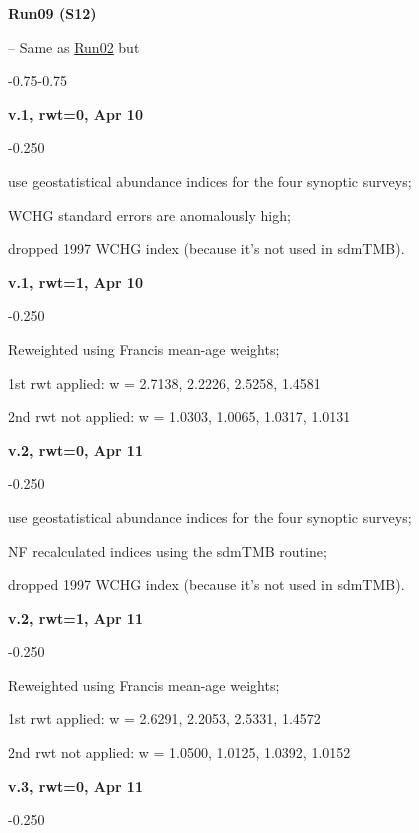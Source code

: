\hypertarget{R09}{\textbf{Run09 (S12)}} -- Same as \hyperlink{R02}{Run02} but
\begin{itemize_csas}{-0.75}{-0.75}
	\item \textbf{v.1, rwt=0, Apr 10}
	\begin{itemize_csas}{-0.25}{0}
		\item use geostatistical abundance indices for the four synoptic surveys;
		\item WCHG standard errors are anomalously high;
		\item dropped 1997 WCHG index (because it's not used in sdmTMB).
	\end{itemize_csas}
	\item \textbf{v.1, rwt=1, Apr 10}
	\begin{itemize_csas}{-0.25}{0}
		\item Reweighted using Francis mean-age weights;
		\item 1st rwt applied: w = 2.7138, 2.2226, 2.5258, 1.4581
		\item 2nd rwt not applied: w = 1.0303, 1.0065, 1.0317, 1.0131
	\end{itemize_csas}
	\item \textbf{v.2, rwt=0, Apr 11}
	\begin{itemize_csas}{-0.25}{0}
		\item use geostatistical abundance indices for the four synoptic surveys;
		\item NF recalculated indices using the sdmTMB routine;
		\item dropped 1997 WCHG index (because it's not used in sdmTMB).
	\end{itemize_csas}
	\item \textbf{v.2, rwt=1, Apr 11}
	\begin{itemize_csas}{-0.25}{0}
		\item Reweighted using Francis mean-age weights;
		\item 1st rwt applied: w = 2.6291, 2.2053, 2.5331, 1.4572
		\item 2nd rwt not applied: w = 1.0500, 1.0125, 1.0392, 1.0152
	\end{itemize_csas}
	\item \textbf{v.3, rwt=0, Apr 11}
	\begin{itemize_csas}{-0.25}{0}

\end{itemize_csas}
\end{itemize_csas}
